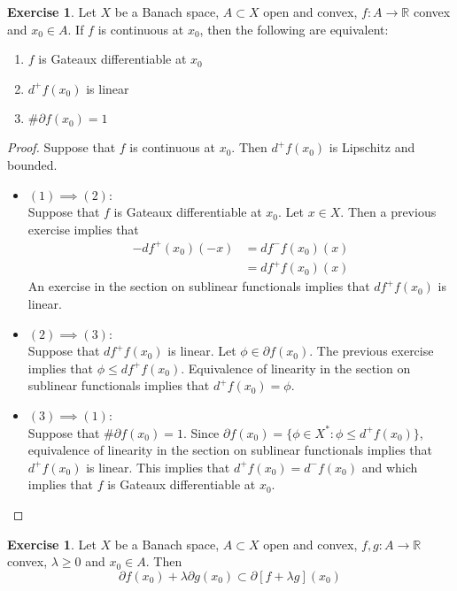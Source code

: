 \documentclass[12pt]{amsart}
\theoremstyle{definition}
\newtheorem{ex}[definition]{Exercise}
\newcommand{\lam}{\lambda}
\newcommand{\R}{\mathbb{R}}
\newcommand{\p}{\partial}
\newcommand{\lex}[1]{\label{ex:#1}}
\begin{document}
	\begin{ex} \lex{}
	Let $X$ be a Banach space, $A \subset X$ open and convex, $f:A \rightarrow \R$ convex and $x_0 \in A$. If $f$ is continuous at $x_0$, then the following are equivalent:
	\begin{enumerate}
	\item $f$ is Gateaux differentiable at $x_0$    
	\item $d^+f(x_0)$ is linear 
	\item $\# \p f(x_0) = 1$
	\end{enumerate}
	\end{ex}	
	
	\begin{proof}
	Suppose that $f$ is continuous at $x_0$. Then $d^+f(x_0)$ is Lipschitz and bounded.
	\begin{itemize}
	\item $(1) \implies (2)$: \\ 
	Suppose that $f$ is Gateaux differentiable at $x_0$. Let $x \in X$. Then a previous exercise implies that 
	\begin{align*}
	-df^+(x_0)(-x) 
	&= df^-f(x_0)(x) \\
	&= df^+f(x_0)(x)
	\end{align*}
	An exercise in the section on sublinear functionals implies that $df^+f(x_0)$ is linear.
	\item $(2) \implies (3)$: \\  
	Suppose that $df^+f(x_0)$ is linear. Let $\phi \in \p f(x_0)$. The previous exercise implies that $\phi \leq df^+f(x_0)$. Equivalence of linearity in the section on sublinear functionals implies that $d^+f(x_0) = \phi$. 
	\item $(3) \implies (1)$: \\  
	Suppose that $\# \p f(x_0) = 1$. Since $\p f(x_0) = \{ \phi \in X^*: \phi \leq d^+ f(x_0) \}$, equivalence of linearity in the section on sublinear functionals implies that $d^+ f(x_0)$ is linear. This implies that $d^+ f(x_0) = d^- f(x_0)$ and which implies that $f$ is Gateaux differentiable at $x_0$.
	\end{itemize}
	\end{proof}
	
	\begin{ex}
	Let $X$ be a Banach space, $A \subset X$ open and convex, $f,g:A \rightarrow \R$ convex, $\lam \geq 0$ and $x_0 \in A$. Then $$\p f(x_0) + \lam \p g(x_0) \subset \p[f + \lam g](x_0)$$
	\end{ex}
	
\end{document}
